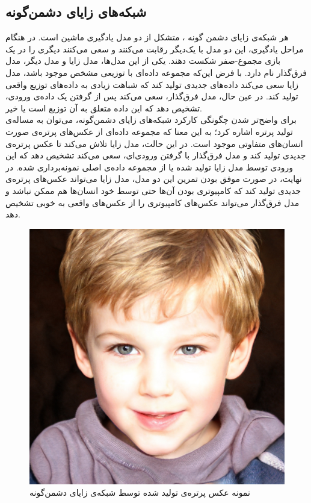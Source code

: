 \subsection{
شبکه‌های زایای دشمن‌گونه
}
هر شبکه‌ی زایای دشمن گونه
، متشکل از دو مدل یادگیری ماشین است.
\cite{goodfellow_gan}
در هنگام مراحل یادگیری، این دو مدل با یک‌دیگر رقابت می‌کنند و سعی می‌کنند دیگری را در یک بازی مجموع-صفر
شکست دهند. یکی از این مدل‌ها، مدل زایا
و مدل دیگر، مدل فرق‌گذار
نام دارد. 
با فرض این‌که مجموعه داده‌ای با توزیعی
مشخص موجود باشد، مدل زایا سعی می‌کند داده‌های جدیدی تولید کند که شباهت زیادی به داده‌های توزیع واقعی تولید کند. در عین حال، مدل فرق‌گذار، سعی می‌کند پس از گرفتن یک داده‌ی ورودی، تشخیص دهد که این داده متعلق به آن توزیع است یا خیر.
\\
برای واضح‌تر شدن چگونگی کارکرد شبکه‌های زایای دشمن‌گونه، می‌توان به مساله‌ی تولید پرتره اشاره کرد؛ به این معنا که مجموعه داده‌ای از عکس‌های پرتره‌ی صورت انسان‌های متفاوتی موجود است. در این حالت، مدل زایا تلاش می‌کند تا عکس پرتره‌ی جدیدی تولید کند و مدل فرق‌گذار با گرفتن ورودی‌ای، سعی می‌کند تشخیص دهد که این ورودی توسط مدل زایا تولید شده یا از مجموعه داده‌ی اصلی نمونه‌برداری شده.
در نهایت، در صورت موفق بودن تمرین این دو مدل، مدل زایا می‌تواند عکس‌های پرتره‌ی جدیدی تولید کند که کامپیوتری بودن آن‌ها حتی توسط خود انسان‌ها هم ممکن نباشد و مدل فرق‌گذار می‌تواند عکس‌های کامپیوتری را از عکس‌های واقعی به خوبی تشخیص دهد. 

\begin{figure}
	\centering
	\includegraphics[scale=0.2]{figures/fakeperson.jpg}
	\caption [
	نمونه عکس پرتره‌ی تولید شده توسط شبکه‌ی زایای دشمن‌گونه
	]{
	نمونه عکس پرتره‌ی تولید شده توسط شبکه‌ی زایای دشمن‌گونه
	\cite{thisperson}
	}
	\label{fig:lstmblock}
\end{figure}